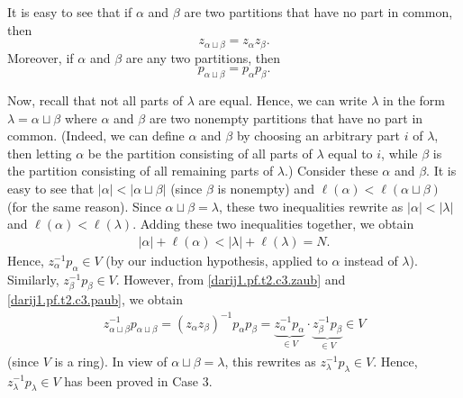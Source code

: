 \documentclass[10pt,a4paper]{article}
\begin{document}
It is easy to see that if $\alpha$ and $\beta$ are two partitions that have no
part in common, then
\begin{equation}
z_{\alpha\sqcup\beta}=z_{\alpha}z_{\beta}.
\label{darij1.pf.t2.c3.zaub}
\tag{5}
\end{equation}
Moreover, if $\alpha$ and $\beta$ are any two partitions, then
\begin{equation}
p_{\alpha\sqcup\beta}=p_{\alpha}p_{\beta}.
\label{darij1.pf.t2.c3.paub}
\tag{6}
\end{equation}




Now, recall that not all parts of $\lambda$ are equal. Hence, we can write
$\lambda$ in the form $\lambda=\alpha\sqcup\beta$ where $\alpha$ and $\beta$
are two nonempty partitions that have no part in common. (Indeed, we can
define $\alpha$ and $\beta$ by choosing an arbitrary part $i$ of $\lambda$,
then letting $\alpha$ be the partition consisting of all parts of $\lambda$
equal to $i$, while $\beta$ is the partition consisting of all remaining parts
of $\lambda$.) Consider these $\alpha$ and $\beta$. It is easy to see that
$\left\vert \alpha\right\vert <\left\vert \alpha\sqcup\beta\right\vert $
(since $\beta$ is nonempty) and $\ell\left(  \alpha\right)  <\ell\left(
\alpha\sqcup\beta\right)  $ (for the same reason). Since $\alpha\sqcup
\beta=\lambda$, these two inequalities rewrite as $\left\vert \alpha
\right\vert <\left\vert \lambda\right\vert $ and $\ell\left(  \alpha\right)
<\ell\left(  \lambda\right)  $. Adding these two inequalities together, we
obtain
\begin{align*}
\left\vert \alpha\right\vert + \ell\left(  \alpha\right)
 <\left\vert \lambda\right\vert +\ell\left(  \lambda\right)  =N.
\end{align*}
Hence, $z_{\alpha}^{-1}p_{\alpha}\in V$ (by our induction hypothesis, applied
to $\alpha$ instead of $\lambda$). Similarly, $z_{\beta}^{-1}p_{\beta}\in V$.
However, from \eqref{darij1.pf.t2.c3.zaub} and \eqref{darij1.pf.t2.c3.paub},
we obtain
\begin{align*}
z_{\alpha\sqcup\beta}^{-1}p_{\alpha\sqcup\beta}=\left(  z_{\alpha}z_{\beta
}\right)  ^{-1}p_{\alpha}p_{\beta}=\underbrace{z_{\alpha}^{-1}p_{\alpha}}_{\in
V}\cdot\underbrace{z_{\beta}^{-1}p_{\beta}}_{\in V}\in V
\end{align*}
(since $V$ is a ring). In view of $\alpha\sqcup\beta=\lambda$, this rewrites
as $z_{\lambda}^{-1}p_{\lambda}\in V$. Hence, $z_{\lambda}^{-1}p_{\lambda}\in
V$ has been proved in Case 3.
\end{document}
